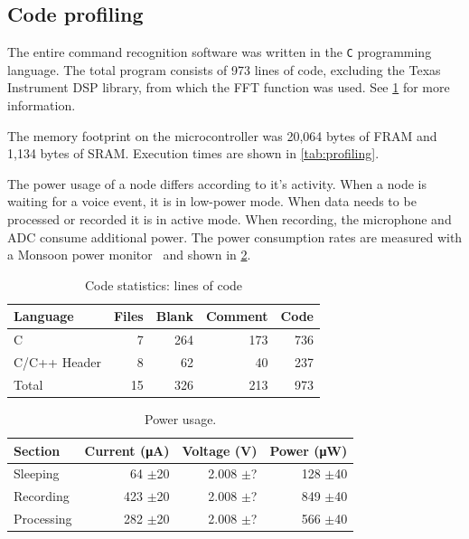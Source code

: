 \subsection{Code profiling}
The entire command recognition software was written in the {\tt C} programming language. The total program consists of 973 lines of code, excluding the Texas Instrument DSP library, from which the FFT function was used. See \ref{tab:code_stats} for more information.

The memory footprint on the microcontroller was 20,064 bytes of FRAM and 1,134 bytes of SRAM. Execution times are shown in \ref{tab:profiling}.

The power usage of a node differs according to it's activity. When a node is waiting for a voice event, it is in low-power mode. When data needs to be processed or recorded it is in active mode. When recording, the microphone and ADC consume additional power. The power consumption rates are measured with a Monsoon power monitor~\cite{monsoon} and shown in \ref{tab:power_usage}.


\begin{table}
	\centering
	\caption{Code statistics: lines of code}
	\label{tab:code_stats}
	\begin{tabular}{lrrrr} \hline
		Language & Files & Blank & Comment & Code \\\hline
		C & 7 & 264 & 173 & 736 \\
		C/C++ Header & 8 & 62 & 40 & 237 \\\hline
		Total &  15 & 326 & 213 & 973 \\\hline
	\end{tabular}
\end{table}

\begin{table}
	\centering
	\caption{Power usage.}
	\label{tab:power_usage}
	\begin{tabular}{lrrr}\hline
	Section & Current (\si{\micro A}) & Voltage (V) &  Power (\si{\micro W}) \\\hline
	Sleeping & 64 $\pm$20 & 2.008 $\pm$? & 128 $\pm$40 \\
	Recording & 423 $\pm$20  & 2.008 $\pm$? &  849 $\pm$40\\
	Processing &  282 $\pm$20 & 2.008 $\pm$?& 566 $\pm$40 \\\hline
	\end{tabular}
\end{table}

\clearpage
